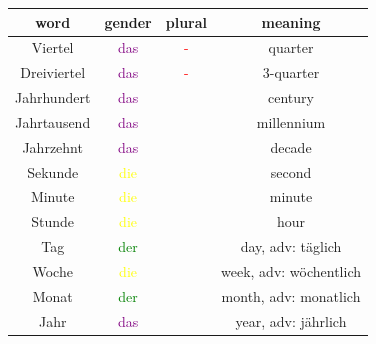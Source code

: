 \begin{center}
    \begin{tabular}{|c|c|c|c|}
        \hline
        \rowcolor{gray}
        word        & gender                  & plural             & meaning                \\
        \hline
        Viertel     & \textcolor{purple}{das} & \textcolor{red}{-} & quarter                \\
        Dreiviertel & \textcolor{purple}{das} & \textcolor{red}{-} & 3-quarter              \\
        Jahrhundert & \textcolor{purple}{das} &                    & century                \\
        Jahrtausend & \textcolor{purple}{das} &                    & millennium             \\
        Jahrzehnt   & \textcolor{purple}{das} &                    & decade                 \\
        \hline
        Sekunde     & \textcolor{yellow}{die} &                    & second                 \\
        Minute      & \textcolor{yellow}{die} &                    & minute                 \\
        Stunde      & \textcolor{yellow}{die} &                    & hour                   \\
        \hline
        Tag         & \textcolor{green}{der}  &                    & day, adv: täglich      \\
        Woche       & \textcolor{yellow}{die} &                    & week, adv: wöchentlich \\
        Monat       & \textcolor{green}{der}  &                    & month, adv: monatlich  \\
        Jahr        & \textcolor{purple}{das} &                    & year, adv: jährlich    \\
        \hline
    \end{tabular}
\end{center}

